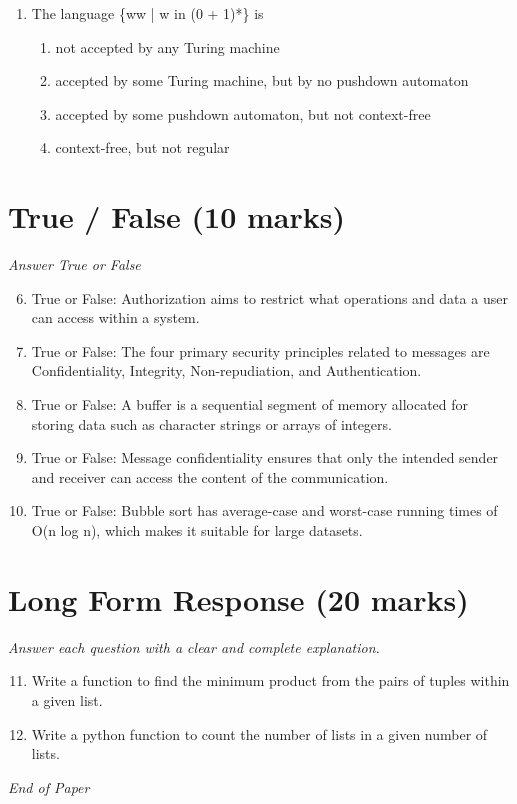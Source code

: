 \documentclass[12pt]{article}
\begin{document}
\begin{enumerate}[label=\arabic*.]
\begin{enumerate}[label=(\alph*)]
    \item Enigma, a transposition cipher
    \item One-time pad
\end{enumerate}
\item The language \{ww | w in (0 + 1)*\} is
\begin{enumerate}[label=(\alph*)]
    \item not accepted by any Turing machine
    \item accepted by some Turing machine, but by no pushdown automaton
    \item accepted by some pushdown automaton, but not context-free
    \item context-free, but not regular
\end{enumerate}
\end{enumerate}

\section*{True / False (10 marks)}
\textit{Answer True or False}
\begin{enumerate}[label=\arabic*.]
\setcounter{enumi}{5}
\item True or False: Authorization aims to restrict what operations and data a user can access within a system.
\item True or False: The four primary security principles related to messages are Confidentiality, Integrity, Non-repudiation, and Authentication.
\item True or False: A buffer is a sequential segment of memory allocated for storing data such as character strings or arrays of integers.
\item True or False: Message confidentiality ensures that only the intended sender and receiver can access the content of the communication.
\item True or False: Bubble sort has average-case and worst-case running times of O(n log n), which makes it suitable for large datasets.
\end{enumerate}

\section*{Long Form Response (20 marks)}
\textit{Answer each question with a clear and complete explanation.}
\begin{enumerate}[label=\arabic*.]
\setcounter{enumi}{10}
\item Write a function to find the minimum product from the pairs of tuples within a given list.
\item Write a python function to count the number of lists in a given number of lists.
\end{enumerate}

\vfill
\noindent\textit{End of Paper}
\end{document}
